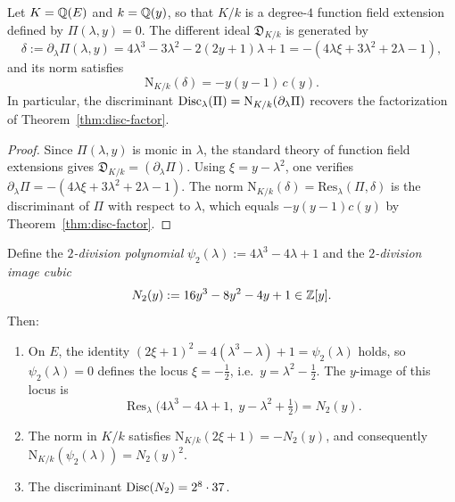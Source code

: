 \begin{corollary}\label{cor:norm-identity}
Let $K=\mathbb{Q}(E)$ and $k=\mathbb{Q}(y)$, so that $K/k$ is a degree-$4$ function field extension defined by $\Pi(\lambda,y)=0$.
The different ideal $\mathfrak{D}_{K/k}$ is generated by
\[
\delta:=\partial_\lambda\Pi(\lambda,y)=4\lambda^3-3\lambda^2-2(2y+1)\lambda+1=-(4\lambda\xi+3\lambda^2+2\lambda-1),
\]
and its norm satisfies
\begin{equation}\label{eq:norm-different}
\mathrm{N}_{K/k}(\delta)=-y(y-1)\,c(y).
\end{equation}
In particular, the discriminant $\operatorname{Disc}_\lambda(\Pi)=\mathrm{N}_{K/k}(\partial_\lambda\Pi)$ recovers the factorization of Theorem~\ref{thm:disc-factor}.
\end{corollary}

\begin{proof}
Since $\Pi(\lambda,y)$ is monic in $\lambda$, the standard theory of function field extensions gives $\mathfrak{D}_{K/k}=(\partial_\lambda\Pi)$.
Using $\xi=y-\lambda^2$, one verifies $\partial_\lambda\Pi=-(4\lambda\xi+3\lambda^2+2\lambda-1)$.
The norm $\mathrm{N}_{K/k}(\delta)=\mathrm{Res}_\lambda(\Pi,\delta)$ is the discriminant of $\Pi$ with respect to $\lambda$, which equals $-y(y-1)c(y)$ by Theorem~\ref{thm:disc-factor}.
\end{proof}

\begin{corollary}\label{cor:division-image}
Define the \emph{$2$-division polynomial} $\psi_2(\lambda):=4\lambda^3-4\lambda+1$ and the \emph{$2$-division image cubic}
\[
N_2(y):=16y^3-8y^2-4y+1\in\mathbb{Z}[y].
\]
Then:
\begin{enumerate}
\item[(i)] On $E$, the identity $(2\xi+1)^2=4(\lambda^3-\lambda)+1=\psi_2(\lambda)$ holds, so $\psi_2(\lambda)=0$ defines the locus $\xi=-\tfrac{1}{2}$, i.e.\ $y=\lambda^2-\tfrac{1}{2}$.
The $y$-image of this locus is
\[
\operatorname{Res}_\lambda\!\bigl(4\lambda^3-4\lambda+1,\;y-\lambda^2+\tfrac{1}{2}\bigr)=N_2(y).
\]
\item[(ii)] The norm in $K/k$ satisfies $\mathrm{N}_{K/k}(2\xi+1)=-N_2(y)$, and consequently
$\mathrm{N}_{K/k}(\psi_2(\lambda))=N_2(y)^2$.
\item[(iii)] The discriminant $\operatorname{Disc}(N_2)=2^8\cdot 37$.
\end{enumerate}
\end{corollary}

